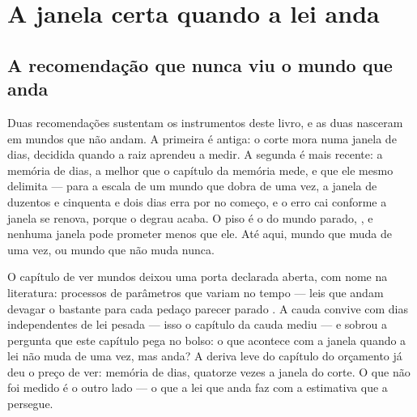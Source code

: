 
\chapter{A janela certa quando a lei anda}
\label{cap:janela}

\section{A recomendação que nunca viu o mundo que anda}

Duas recomendações sustentam os instrumentos deste livro, e as duas nasceram em mundos que não
andam. A primeira é antiga: o corte mora numa janela de \numCorteJanela{} dias, decidida quando a
raiz aprendeu a medir. A segunda é mais recente: a memória de \numEsquecimentoMelhorMemoria{}
dias, a melhor que o capítulo da memória mede, e que ele mesmo delimita --- para a escala de um
mundo que dobra de uma vez, a janela de duzentos e cinquenta e dois dias erra por
\numEsquecimentoJanelaDuzentosECinquenta{} no começo, e o erro cai conforme a janela se renova,
porque o degrau acaba. O piso é o do mundo parado,
\numEsquecimentoPisoJanelaDuzentosECinquenta, e nenhuma janela pode prometer menos que ele. Até
aqui, mundo que muda de uma vez, ou mundo que não muda nunca.

O capítulo de ver mundos deixou uma porta declarada aberta, com nome na literatura: processos de
parâmetros que variam no tempo \cite{palma2010efficient} --- leis que andam devagar o bastante
para cada pedaço parecer parado \cite{dahlhaus1997estimation,dahlhaus2012locally}. A cauda convive com dias independentes de lei
pesada --- isso o capítulo da cauda mediu --- e sobrou a pergunta que este capítulo pega no bolso:
o que acontece com a janela quando a lei não muda de uma vez, mas anda? A deriva leve do capítulo
do orçamento já deu o preço de ver: memória de \numFormasMemoriaDerivaLeve{} dias, quatorze vezes
a janela do corte. O que não foi medido é o outro lado --- o que a lei que anda faz com a
estimativa que a persegue.

